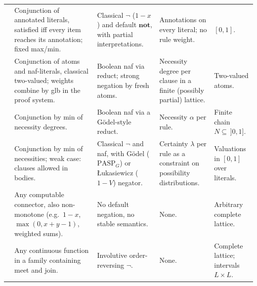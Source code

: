 {\begin{longtable}{@{}p{}p{}p{}p{}p{}@{}}
            \cite{Saad2009extended,Saad2010disjunctive}      & Conjunction of annotated literals, satisfied iff every item reaches its annotation; fixed max/min.                                                 & Classical $\neg$ ($1-x$) and default $\mathbf{not}$, with partial interpretations.                 & Annotations on every literal; no rule weight.                                                   & $[0,1]$.                                              \\
            \cite{NievesOC07,NievesOC13}                     & Conjunction of atoms and naf-literals, classical two-valued; weights combine by glb in the proof system.                                           & Boolean naf via reduct; strong negation by fresh atoms.                                            & Necessity degree per clause in a finite (possibly partial) lattice.                             & Two-valued atoms.                                     \\
            \cite{NicolasGSL06}                              & Conjunction by min of necessity degrees.                                                                                                           & Boolean naf via a Gödel-style reduct.                                                              & Necessity $\alpha$ per rule.                                                                    & Finite chain $N\subseteq\,]0,1]$.                     \\
            \cite{BautersSDV14tplp,BautersSDV14ijar}         & Conjunction by min of necessities; weak case: clauses allowed in bodies.                                                                           & Classical $\neg$ and naf, with Gödel ($\mathrm{PASP}_G$) or Łukasiewicz ($1-V$) negator.           & Certainty $\lambda$ per rule as a constraint on possibility distributions.                      & Valuations in $[0,1]$ over literals.                  \\
            \cite{StracciaOD09}                              & Any computable connector, also non-monotone (e.g.\ $1-x$, $\max(0,x+y-1)$, weighted sums).                                                         & No default negation, no stable semantics.                                                          & None.                                                                                           & Arbitrary complete lattice.                           \\
            \cite{LoyerS09}                                  & Any continuous function in a family containing meet and join.                                                                                      & Involutive order-reversing $\neg$.                                                                 & None.                                                                                           & Complete lattice; intervals $L\times L$.              \\

\end{longtable}}
